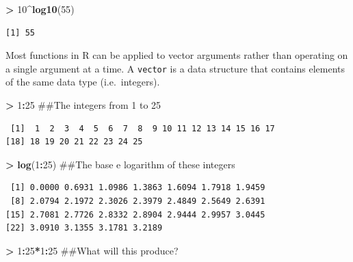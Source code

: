 \documentclass[]{krantz}
\makeatletter
\newenvironment{Shaded}{\begin{snugshade}}{\end{snugshade}}
\newcommand{\KeywordTok}[1]{\textcolor[rgb]{0.27,0.27,0.27}{\textbf{#1}}}
\newcommand{\DecValTok}[1]{\textcolor[rgb]{0.06,0.06,0.06}{#1}}
\newcommand{\StringTok}[1]{\textcolor[rgb]{0.5,0.5,0.5}{#1}}
\newcommand{\OperatorTok}[1]{\textcolor[rgb]{0.43,0.43,0.43}{\textbf{#1}}}
\newcommand{\NormalTok}[1]{#1}
\newenvironment{kframe}{%
\medskip{}
\setlength{\fboxsep}{.8em}
 \def\at@end@of@kframe{}%
 \ifinner\ifhmode%
  \def\at@end@of@kframe{\end{minipage}}%
  \begin{minipage}{\columnwidth}%
 \fi\fi%
 \def\FrameCommand##1{\hskip\@totalleftmargin \hskip-\fboxsep
 \colorbox{shadecolor}{##1}\hskip-\fboxsep
     \hskip-\linewidth \hskip-\@totalleftmargin \hskip\columnwidth}%
 \MakeFramed {\advance\hsize-\width
   \@totalleftmargin\z@ \linewidth\hsize
   \@setminipage}}%
 {\par\unskip\endMakeFramed%
 \at@end@of@kframe}
\renewenvironment{Shaded}{\begin{kframe}}{\end{kframe}}
\makeatother
\begin{document}
\begin{Shaded}
\begin{Highlighting}[]
\OperatorTok{>}\StringTok{ }\DecValTok{10}\OperatorTok{^}\KeywordTok{log10}\NormalTok{(}\DecValTok{55}\NormalTok{)}
\end{Highlighting}
\end{Shaded}

\begin{verbatim}
[1] 55
\end{verbatim}

Most functions in R can be applied to vector arguments rather than
operating on a single argument at a time. A \texttt{vector} is a data
structure that contains elements of the same data type (i.e.~integers).

\begin{Shaded}
\begin{Highlighting}[]
\OperatorTok{>}\StringTok{ }\DecValTok{1}\OperatorTok{:}\DecValTok{25}\NormalTok{ ##The integers from 1 to 25}
\end{Highlighting}
\end{Shaded}

\begin{verbatim}
 [1]  1  2  3  4  5  6  7  8  9 10 11 12 13 14 15 16 17
[18] 18 19 20 21 22 23 24 25
\end{verbatim}

\begin{Shaded}
\begin{Highlighting}[]
\OperatorTok{>}\StringTok{ }\KeywordTok{log}\NormalTok{(}\DecValTok{1}\OperatorTok{:}\DecValTok{25}\NormalTok{) ##The base e logarithm of these integers}
\end{Highlighting}
\end{Shaded}

\begin{verbatim}
 [1] 0.0000 0.6931 1.0986 1.3863 1.6094 1.7918 1.9459
 [8] 2.0794 2.1972 2.3026 2.3979 2.4849 2.5649 2.6391
[15] 2.7081 2.7726 2.8332 2.8904 2.9444 2.9957 3.0445
[22] 3.0910 3.1355 3.1781 3.2189
\end{verbatim}

\begin{Shaded}
\begin{Highlighting}[]
\OperatorTok{>}\StringTok{ }\DecValTok{1}\OperatorTok{:}\DecValTok{25}\OperatorTok{*}\DecValTok{1}\OperatorTok{:}\DecValTok{25}\NormalTok{ ##What will this produce?}
\end{Highlighting}
\end{Shaded}
\end{document}

